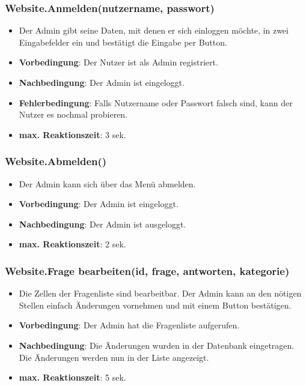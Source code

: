 \documentclass[fontsize=12pt,paper=a4,twoside]{scrartcl}
\begin{document}
\subsubsection{Website.Anmelden(nutzername, passwort)}
\begin{itemize}
\item Der Admin gibt seine Daten, mit denen er sich einloggen möchte, in zwei Eingabefelder ein und bestätigt die Eingabe per Button.
\item \textbf{Vorbedingung}: Der Nutzer ist als Admin registriert.
\item \textbf{Nachbedingung}: Der Admin ist eingeloggt.
\item \textbf{Fehlerbedingung}: Falls Nutzername oder Passwort falsch sind, kann der Nutzer es nochmal probieren.
\item \textbf{max. Reaktionszeit}: 3 sek.
\end{itemize}

\subsubsection{Website.Abmelden()}
\begin{itemize}
\item Der Admin kann sich über das Menü abmelden.
\item \textbf{Vorbedingung}: Der Admin ist eingeloggt.
\item \textbf{Nachbedingung}: Der Admin ist ausgeloggt.
\item \textbf{max. Reaktionszeit}: 2 sek.
\end{itemize}

\subsubsection{Website.Frage bearbeiten(id, frage, antworten, kategorie)}
\begin{itemize}
\item Die Zellen der Fragenliste sind bearbeitbar. Der Admin kann an den nötigen Stellen einfach Änderungen vornehmen und mit einem Button bestätigen.
\item \textbf{Vorbedingung}: Der Admin hat die Fragenliste aufgerufen.
\item \textbf{Nachbedingung}: Die Änderungen wurden in der Datenbank eingetragen. Die Änderungen werden nun in der Liste angezeigt.
\item \textbf{max. Reaktionszeit}: 5 sek.
\end{itemize}
\end{document}
